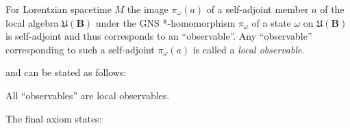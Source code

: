 \begin{definition}
    \label{def:local-observable}
    \leanok
    For Lorentzian spacetime $M$ the image $\pi_\omega(a)$ of a self-adjoint member $a$ of the local algebra $\mathfrak{U}(\mathbf{B})$ under the GNS *-homomorphism $\pi_\omega$ of a state $\omega$ on $\mathfrak{U}(\mathbf{B})$ is self-adjoint and thus corresponds to an ``observable''. Any ``observable'' corresponding to such a self-adjoint $\pi_\omega(a)$ is called a \textit{local observable}.
\end{definition}

and can be stated as follows:

\begin{definition}
    \label{def:local-completeness-in-curved-spacetime}
    \leanok
    All ``observables'' are local observables.
\end{definition}

The final axiom states:

